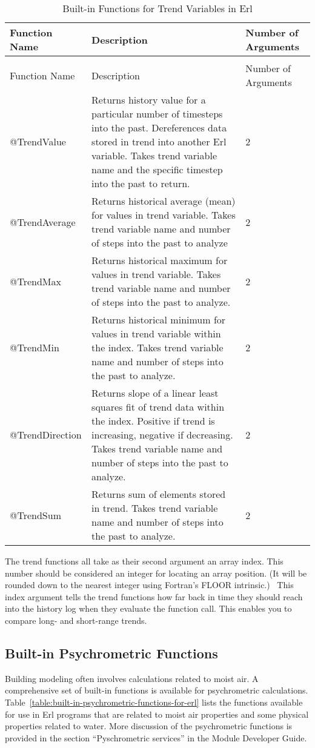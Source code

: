 \begin{longtable}[c]{p{1.5in}p{3.0in}p{1.5in}}
\caption{Built-in Functions for Trend Variables in Erl \label{table:built-in-functions-for-trend-variables-in-erl}} \tabularnewline
\toprule 
Function Name & Description & Number of Arguments \tabularnewline \midrule
\endfirsthead

\caption[]{Built-in Functions for Trend Variables in Erl} \tabularnewline
\toprule 
Function Name & Description & Number of Arguments \tabularnewline \midrule
\endhead

@TrendValue & Returns history value for a particular number of timesteps into the past. Dereferences data stored in trend into another Erl variable. Takes trend variable name and the specific timestep into the past to return. & 2 \tabularnewline
@TrendAverage & Returns historical average (mean) for values in trend variable. Takes trend variable name and number of steps into the past to analyze & 2 \tabularnewline
@TrendMax & Returns historical maximum for values in trend variable. Takes trend variable name and number of steps into the past to analyze. & 2 \tabularnewline
@TrendMin & Returns historical minimum for values in trend variable within the index. Takes trend variable name and number of steps into the past to analyze. & 2 \tabularnewline
@TrendDirection & Returns slope of a linear least squares fit of trend data within the index. Positive if trend is increasing, negative if decreasing. Takes trend variable name and number of steps into the past to analyze. & 2 \tabularnewline
@TrendSum & Returns sum of elements stored in trend. Takes trend variable name and number of steps into the past to analyze. & 2 \tabularnewline
\bottomrule
\end{longtable}

The trend functions all take as their second argument an array index. This number should be considered an integer for locating an array position. (It will be rounded down to the nearest integer using Fortran's FLOOR intrinsic.)~ This index argument tells the trend functions how far back in time they should reach into the history log when they evaluate the function call. This enables you to compare long- and short-range trends.

\subsection{Built-in Psychrometric Functions}\label{built-in-psychrometric-functions}

Building modeling often involves calculations related to moist air. A comprehensive set of built-in functions is available for psychrometric calculations. Table~\ref{table:built-in-psychrometric-functions-for-erl} lists the functions available for use in Erl programs that are related to moist air properties and some physical properties related to water. More discussion of the psychrometric functions is provided in the section ``Pyschrometric services'' in the Module Developer Guide.

